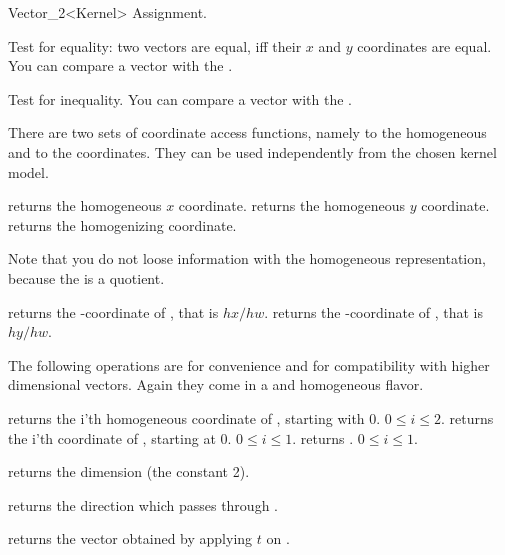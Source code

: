 \begin{ccRefClass} {Vector_2<Kernel>}
\ccHidden {}
        {Assignment.}

       {Test for equality: two vectors are equal, iff their $x$ and $y$ 
        coordinates are equal. You can compare a vector with the
        .}

       {Test for inequality. You can compare a vector with the
        .}

There are two sets of coordinate access functions, namely to the
homogeneous and to the  coordinates. They can be used
independently from the chosen kernel model.

       {returns the homogeneous $x$ coordinate.}
\ccGlue
{}
       {returns the homogeneous $y$ coordinate.}
\ccGlue
{}
       {returns the homogenizing  coordinate.}

Note that you do not loose information with the homogeneous
representation, because the  is a quotient.

       {returns the -coordinate of \ccVar, that is $hx/hw$.}
\ccGlue
{}
       {returns the -coordinate of \ccVar, that is $hy/hw$.}
       
The following operations are for convenience and for compatibility
with higher dimensional vectors.  Again they come in a
 and homogeneous flavor.

       {returns the i'th homogeneous coordinate of \ccVar, starting with 0.
        \ccPrecond $0\leq i \leq 2$.}
\ccGlue
{}
       {returns the i'th  coordinate of \ccVar, starting at 0.
        \ccPrecond $0\leq i \leq 1$.}
\ccGlue
{}
       {returns  .
        \ccPrecond $0\leq i \leq 1$.}

       {returns the dimension (the constant 2).}

       {returns the direction which passes through \ccVar.}

       {returns the vector obtained by applying $t$ on \ccVar.}


\end{ccRefClass}
